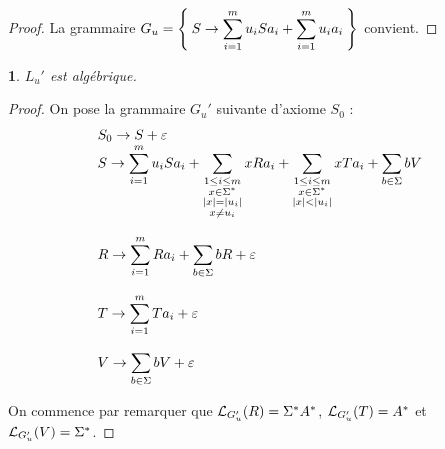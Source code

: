 \documentclass[11pt,a4paper]{article}
\theoremstyle{plain}
\theoremstyle{definition}
\theoremstyle{definition}
\theoremstyle{remark}
\theoremstyle{remark}
\theoremstyle{plain}
\newtheorem{lem}[thm]{\protect\lemmaname}
\theoremstyle{plain}
\theoremstyle{plain}
\theoremstyle{remark}
\providecommand{\lemmaname}{Lemme}
\begin{document}
\begin{proof}
	La grammaire $\displaystyle G_u = \Set{S\to \sum_{i=1}^mu_iSa_i+\sum_{i=1}^mu_ia_i}$ convient.
\end{proof}

\begin{lem}
	$L_u'$ est algébrique.
\end{lem}

\begin{proof}
	On pose la grammaire $G_u'$ suivante d'axiome $S_0$ :
	\[\begin{array}{l}
	\displaystyle S_0 \to S + \varepsilon\\
	\displaystyle S\to \sum_{i=1}^mu_iSa_i + \sum_{\substack{1\le i \le m\\x\in\Sigma^*\\ \left|x\right|=\left|u_i\right|\\x\not=u_i}}xRa_i+\sum\limits_{\substack{1\le i\le m\\x\in\Sigma^*\\\left|x\right|<\left|u_i\right|}}xTa_i+\sum\limits_{b\in \Sigma}bV\\\\
	\displaystyle R\to \sum_{i=1}^mRa_i+\sum_{b\in\Sigma}bR+\varepsilon\\\\
	\displaystyle T\to \sum_{i=1}^mTa_i+\varepsilon\\\\
	\displaystyle V\to \sum_{b\in\Sigma}bV+\varepsilon
	\end{array}\]
	
	On commence par remarquer que $\mathcal{L}_{G_u'}(R)=\Sigma^*A^*$, $\mathcal{L}_{G_u'}(T)=A^*$ et $\mathcal{L}_{G_u'}(V)=\Sigma^*$.
	

\end{proof}
\end{document}
